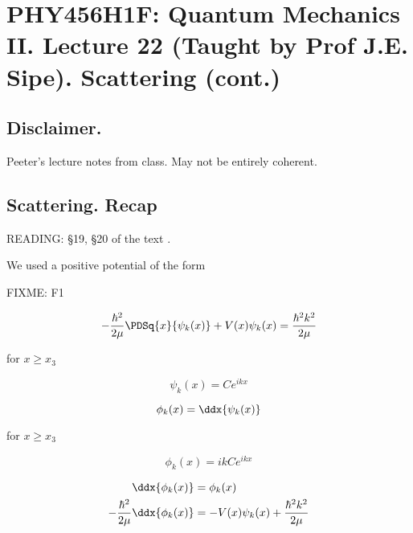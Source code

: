 
%

\chapter{PHY456H1F: Quantum Mechanics II.  Lecture 22 (Taught by Prof J.E. Sipe).  Scattering (cont.)}
\label{chap:qmTwoL22}
{}
\date{Nov XX, 2011}

\beginArtWithToc

\section{Disclaimer.}

Peeter's lecture notes from class.  May not be entirely coherent.

\section{Scattering.  Recap}

READING: \S 19, \S 20 of the text \cite{desai2009quantum}.

We used a positive potential of the form

FIXME: F1

\begin{equation}\label{eqn:qmTwoL22:10}
-\frac{\hbar^2}{2 \mu} \PDSq{x}{\psi_k(x)} + V(x) \psi_k(x) = \frac{\hbar^2 k^2}{2 \mu}
\end{equation}

for $x \ge x_3$

\begin{equation}\label{eqn:qmTwoL22:30}
\psi_k(x) = C e^{i k x}
\end{equation}

\begin{equation}\label{eqn:qmTwoL22:50}
\phi_k(x) = \ddx{\psi_k(x)}
\end{equation}

for $x \ge x_3$ 

\begin{equation}\label{eqn:qmTwoL22:70}
\phi_k(x) = i k C e^{i k x}
\end{equation}

\begin{align}\label{eqn:qmTwoL22:90}
\ddx{\phi_k(x)} &= \phi_k(x) \\
-\frac{\hbar^2}{2 \mu} \ddx{\phi_k(x)} &= - V(x) \psi_k(x) + \frac{\hbar^2 k^2}{2 \mu}
\end{align}

